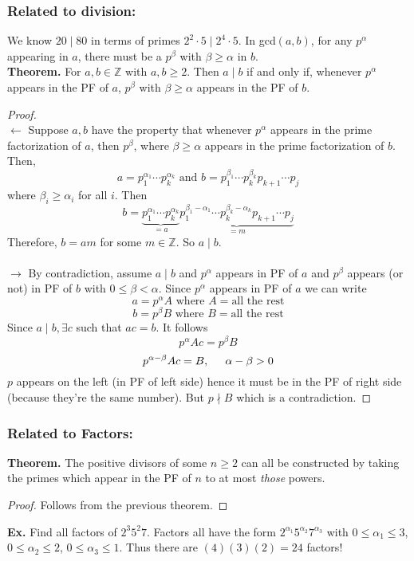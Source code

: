\documentclass[class=article, crop=false]{standalone}
\def\integers{{\mathbb Z}}
\begin{document}
\subsubsection*{Related to division:}We know $20\mid 80$ in terms of primes $2^2\cdot 5\mid 2^4\cdot5$. In gcd$(a,b)$, for any
$p^\alpha$ appearing in $a$, there must be a $p^\beta$ with $\beta \geq\alpha$ in $b$.\\
\textbf{Theorem.} For $a,b\in\integers$ with $a,b\geq 2$. Then $a\mid b$ if and only if, whenever $p^\alpha$
appears in the PF of $a$, $p^\beta$ with $\beta\geq\alpha$ appears in the PF of $b$.
\begin{proof}
	$ $\\
	$\leftarrow$ Suppose $a,b$ have the property that whenever $p^\alpha$ appears in the prime factorization of $a$, then
	$p^\beta$, where $\beta\geq \alpha$ appears in the prime factorization of $b$.
	Then, $$a=p_1^{\alpha_1}\cdots p_{k}^{\alpha_k} \text{ and } b=p_{1}^{\beta_1}\cdots p_{k}^{\beta_{k}}p_{k+1}\cdots p_j$$
	where $\beta_i \geq \alpha_i$ for all $i$. Then 
	$$b= \underbrace{p_1^{\alpha_1}\cdots p_{k}^{\alpha_k}}_{=a} \underbrace{p_{1}^{\beta_1-\alpha_1}\cdots p_{k}^{\beta_{k}-\alpha_k}p_{k+1}\cdots p_j}_{=m}$$
	Therefore, $b=am$ for some $m\in\integers$. So $a\mid b$.\\\\
	$\rightarrow$ By contradiction, assume $a\mid b$ and $p^\alpha$ appears in PF of $a$ and $p^\beta$ appears (or not)
	in PF of $b$ with $0\leq\beta<\alpha$. Since $p^\alpha$ appears in PF of $a$ we can write
	$$a=p^\alpha A \text{ where } A =\text{all the rest}$$
	$$b=p^\beta B \text{ where } B =\text{all the rest}$$
	Since $a\mid b, \exists c$ such that $ac=b$. It follows $$p^\alpha Ac = p^\beta B$$
	$$p^{\alpha - \beta}Ac = B, \hspace{5mm} \alpha - \beta >0$$
	$p$ appears on the left (in PF of left side) hence it must be in the PF of right side (because they're the same number).
	But $p\nmid B$ which is a contradiction.
\end{proof}
\subsubsection*{Related to Factors:}
\textbf{Theorem.} The positive divisors of some $n\geq 2$ can all be constructed by taking the primes which appear
in the PF of $n$ to at most \emph{those} powers.
\begin{proof}
	Follows from the previous theorem.
\end{proof}
\noindent\textbf{Ex.} Find all factors of $2^3 5^2 7$. Factors all have the form $2^{\alpha_1}5^{\alpha_2}7^{\alpha_3}$
with $0\leq\alpha_1\leq3$, $0\leq\alpha_2\leq2$, $0\leq\alpha_3\leq 1$. Thus there are $(4)(3)(2)=24$ factors!
\end{document}
